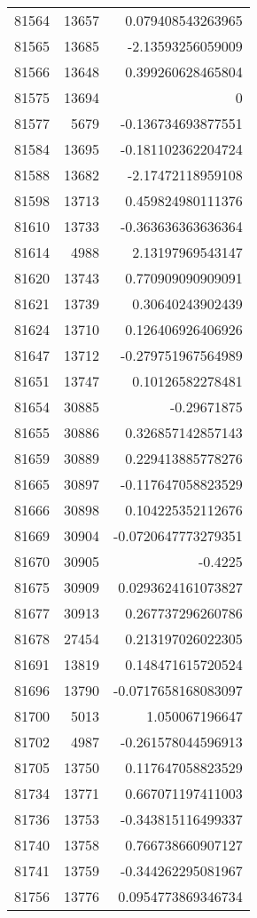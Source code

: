 \begin{tabular}{r | r | r}
81564 & 13657 & 0.079408543263965 \\
81565 & 13685 & -2.13593256059009 \\
81566 & 13648 & 0.399260628465804 \\
81575 & 13694 & 0 \\
81577 & 5679 & -0.136734693877551 \\
81584 & 13695 & -0.181102362204724 \\
81588 & 13682 & -2.17472118959108 \\
81598 & 13713 & 0.459824980111376 \\
81610 & 13733 & -0.363636363636364 \\
81614 & 4988 & 2.13197969543147 \\
81620 & 13743 & 0.770909090909091 \\
81621 & 13739 & 0.30640243902439 \\
81624 & 13710 & 0.126406926406926 \\
81647 & 13712 & -0.279751967564989 \\
81651 & 13747 & 0.10126582278481 \\
81654 & 30885 & -0.29671875 \\
81655 & 30886 & 0.326857142857143 \\
81659 & 30889 & 0.229413885778276 \\
81665 & 30897 & -0.117647058823529 \\
81666 & 30898 & 0.104225352112676 \\
81669 & 30904 & -0.0720647773279351 \\
81670 & 30905 & -0.4225 \\
81675 & 30909 & 0.0293624161073827 \\
81677 & 30913 & 0.267737296260786 \\
81678 & 27454 & 0.213197026022305 \\
81691 & 13819 & 0.148471615720524 \\
81696 & 13790 & -0.0717658168083097 \\
81700 & 5013 & 1.050067196647 \\
81702 & 4987 & -0.261578044596913 \\
81705 & 13750 & 0.117647058823529 \\
81734 & 13771 & 0.667071197411003 \\
81736 & 13753 & -0.343815116499337 \\
81740 & 13758 & 0.766738660907127 \\
81741 & 13759 & -0.344262295081967 \\
81756 & 13776 & 0.0954773869346734 \\

\end{tabular}
